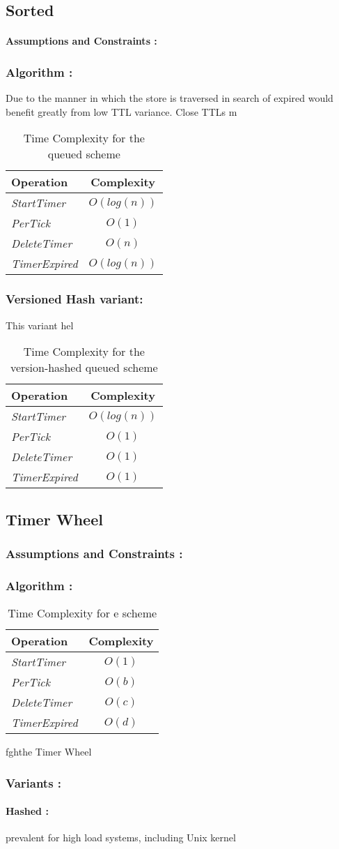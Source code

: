 \documentclass[twocolumn,a4paper]{article}
\newcommand{\complexity}[5]{
\begin{table}[h!]
	\begin{center}
		\begin{tabular}{l|c}
			\textbf{Operation} & \textbf{Complexity} \\
			\hline
			\textit{StartTimer} & $O(#1)$  \\
			\textit{PerTick} & $O(#2)$ \\
			\textit{DeleteTimer} & $O(#3)$ \\
			\textit{TimerExpired} & $O(#4)$ \\
		\end{tabular}
		\caption{Time Complexity for #5 scheme}
	\end{center}
\end{table}
}
\begin{document}
\subsection{Sorted}

\paragraph{Assumptions and Constraints :}

\subsubsection{Algorithm :}

Due to the manner in which the store is traversed in search of expired would benefit greatly from low TTL variance. Close TTLs m



\complexity{log(n)}{1}{n}{log(n)}{the queued}



\subsubsection{Versioned Hash variant:}
This variant hel
\complexity{log(n)}{1}{1}{1}{the version-hashed queued}



\subsection{Timer Wheel}

\subsubsection{Assumptions and Constraints :}

\subsubsection{Algorithm :}

\complexity{1}{b}{c}{d}{e}{f}{g}{h}{the Timer Wheel}


\subsubsection{Variants :}

\paragraph{Hashed :}
prevalent for high load systems, including Unix kernel
\end{document}
